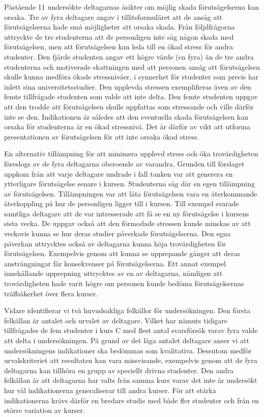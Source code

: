 Påstående 11 undersökte deltagarnas åsikter om möjlig skada förutsägelserna kan orsaka. Tre av fyra deltagare angav i tillitsformuläret att de ansåg att förutsägelserna hade små möjligheter att orsaka skada. Från följdfrågorna uttryckte de tre studenterna att de personligen inte såg någon skada med förutsägelsen, men att förutsägelsen kan leda till en ökad stress för andra studenter. Den fjärde studenten angav ett högre värde (en fyra) än de tre andra studenterna och motiverade skattningen med att personen ansåg att förutsägelsen skulle kunna medföra ökade stressnivåer, i synnerhet för studenter som precis har inlett sina universitetsstudier. Den upplevda stressen exemplifieras även av den femte tillfrågade studenten som valde att inte delta. Den femte studenten uppgav att den trodde att förutsägelsen skulle uppfattas som stressande och ville därför inte se den. Indikationen är således att den eventuella skada förutsägelsen kan orsaka för studenterna är en ökad stressnivå. Det är därför av vikt att utforma presentationen av förutsägelsen för att inte orsaka ökad stress.

En alternativ tillämpning för att minimera upplevd stress och öka trovärdigheten föreslogs av de fyra deltagarna oberoende av varandra. Grunden till förslaget uppkom från att varje deltagare undrade i fall tanken var att generera en ytterligare förutsägelse senare i kursen. Studenterna såg där en egen tillämpning av förutsägelsen. Tillämpningen var att låta förutsägelsen vara en återkommande återkoppling på hur de personligen ligger till i kursen. Till exempel svarade samtliga deltagare att de var intresserade att få se en ny förutsägelse i kursens sista vecka. De uppgav också att den förmodade stressen kunde minskas av att veckovis kunna se hur deras studier påverkade förutsägelserna. Den egna påverkan uttrycktes också av deltagarna kunna höja trovärdigheten för förutsägelsen. Exempelvis genom att kunna se upprepande gånger att deras ansträngningar får konsekvenser på förutsägelserna. Ett annat exempel innehållande upprepning uttrycktes av en av deltagarna, nämligen att trovärdigheten hade varit högre om personen kunde bedöma förutsägelsernas träffsäkerhet över flera kurser.

Vidare identifierar vi två huvudsakliga felkällor för undersökningen. Den första felkällan är antalet och urvalet av deltagare. Vilket har nämnts tidigare tillfrågades de fem studenter i kurs C med flest antal svarsförsök varav fyra valde att delta i undersökningen. På grund av det låga antalet deltagare anser vi att undersökningens indikationer ska bedömmas som kvalitativa. Dessutom medför urvalskriteriet att resultaten kan vara missvisande, exempelvis genom att de fyra deltagarna kan tillhöra en grupp av speciellt drivna studenter. Den andra felkällan är att deltagarna har valts från samma kurs varav det inte är undersökt hur väl indikationerna generaliserar till andra kurser. För att stärka indikationerna krävs därför en bredare studie med både fler studenter och från en större variation av kurser.

